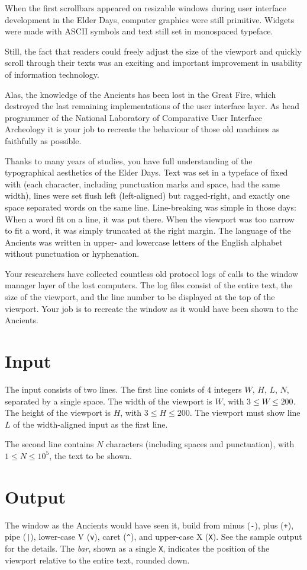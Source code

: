 
When the first scrollbars appeared on resizable windows during user interface development in the Elder Days, computer graphics were still primitive.
Widgets were made with ASCII symbols and text still set in monospaced typeface.

Still, the fact that readers could freely adjust the size of the viewport and quickly scroll through their texts was an exciting and important improvement in usability of information technology.

Alas, the knowledge of the Ancients has been lost in the Great Fire, which destroyed the last remaining implementations of the user interface layer. 
As head programmer of the National Laboratory of Comparative User Interface Archeology it is your job to recreate the behaviour of those old machines as faithfully as possible.

Thanks to many years of studies, you have full understanding of the typographical aesthetics of the Elder Days.
Text was set in a typeface of fixed with (each character, including punctuation marks and space, had the same width), lines were set flush left (left-aligned) but ragged-right, and exactly one space separated words on the same line.
Line-breaking was simple in those days: When a word fit on a line, it was put there.
When the viewport was too narrow to fit a word, it was simply truncated at the right margin. 
The language of the Ancients was written in upper- and lowercase letters of the English alphabet without punctuation or hyphenation.

Your researchers have collected countless old protocol logs of calls to the window manager layer of the lost computers.
The log files consist of the entire text, the size of the viewport, and the line number to be displayed at the top of the viewport.
Your job is to recreate the window as it would have been shown to the Ancients.

\section*{Input}

The input consists of two lines.
The first line conists of $4$ integers $W$, $H$, $L$, $N$, separated by a single space.
The width of the viewport is $W$, with $3\leq W\leq 200$.
The height of the viewport is $H$, with $3\leq H\leq 200$.
The viewport must show line $L$ of the width-aligned input as the first line.

The second line contains $N$ characters (including spaces and punctuation), with $1\leq N\leq 10^5$, the text to be shown.

\section*{Output}

The window as the Ancients would have seen it, build from minus (\verb!-!), plus (\verb!+!), pipe (\verb!|!), lower-case V (\verb!v!), caret (\verb!^!), and upper-case X (\verb!X!).
See the sample output for the details.
The \emph{bar}, shown as a single \verb!X!, indicates the position of the viewport relative to the entire text, rounded down.
